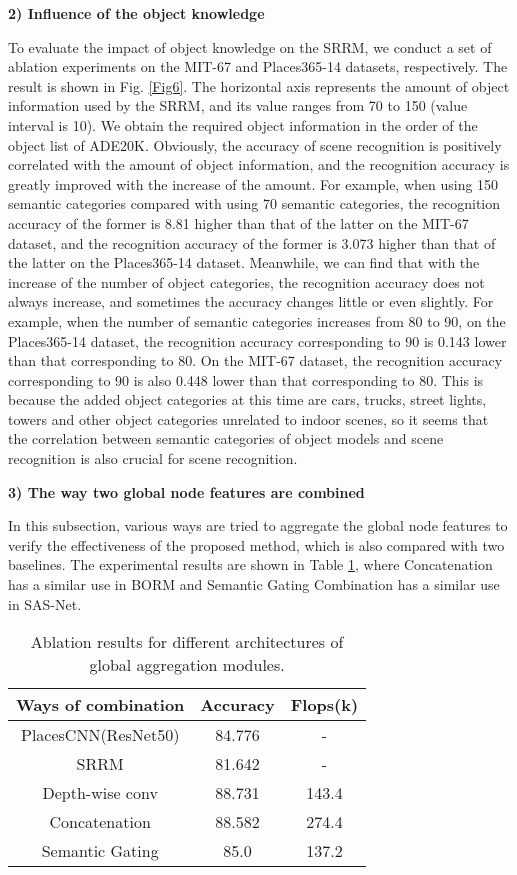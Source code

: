 \documentclass[conference]{IEEEtran}
\begin{document}
\textbf{2) Influence of the object knowledge}

To evaluate the impact of object knowledge on the SRRM, we conduct a set of ablation experiments on the MIT-67 and Places365-14 datasets, respectively. The result is shown in Fig. \ref{Fig6}. The horizontal axis represents the amount of object information used by the SRRM, and its value ranges from 70 to 150 (value interval is 10). We obtain the required object information in the order of the object list of ADE20K. Obviously, the accuracy of scene recognition is positively correlated with the amount of object information, and the recognition accuracy is greatly improved with the increase of the amount. For example, when using 150 semantic categories compared with using 70 semantic categories, the recognition accuracy of the former is 8.81 higher than that of the latter on the MIT-67 dataset, and the recognition accuracy of the former is 3.073 higher than that of the latter on the Places365-14 dataset. Meanwhile, we can find that with the increase of the number of object categories, the recognition accuracy does not always increase, and sometimes the accuracy changes little or even slightly. For example, when the number of semantic categories increases from 80 to 90, on the Places365-14 dataset, the recognition accuracy corresponding to 90 is 0.143 lower than that corresponding to 80. On the MIT-67 dataset, the recognition accuracy corresponding to 90 is also 0.448 lower than that corresponding to 80. This is because the added object categories at this time are cars, trucks, street lights, towers and other object categories unrelated to indoor scenes, so it seems that the correlation between semantic categories of object models and scene recognition is also crucial for scene recognition.

\textbf{3) The way two global node features are combined}

In this subsection, various ways are tried to aggregate the global node features to verify the effectiveness of the proposed method, which is also compared with two baselines. The experimental results are shown in Table \ref{tab2}, where Concatenation has a similar use in BORM\cite{ref20} and Semantic Gating Combination has a similar use in SAS-Net\cite{ref17}.

\begin{table}[htbp]
    \centering
    \caption{Ablation results for different architectures of global aggregation modules.}
    \begin{tabular}{ccc}
    \hline
        \textbf{Ways of combination} & \textbf{Accuracy} & \textbf{Flops(k)}  \\ \hline
        PlacesCNN(ResNet50) & 84.776 & -  \\ 
        SRRM & 81.642 & -  \\ 
        Depth-wise conv & 88.731 & 143.4  \\ 
        Concatenation & 88.582 & 274.4  \\ 
        Semantic Gating & 85.0 & 137.2  \\ \hline
    \end{tabular}
    \label{tab2}
\end{table}
\end{document}
